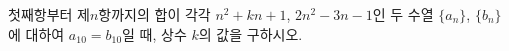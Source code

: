 첫째항부터 제$n$항까지의 합이 각각 $n^2+kn+1$, $2n^2-3n-1$인 두 수열 $\{a_n\}$, $\{b_n\}$에 대하여 $a_{10}=b_{10}$일 때, 상수 $k$의 값을 구하시오.
